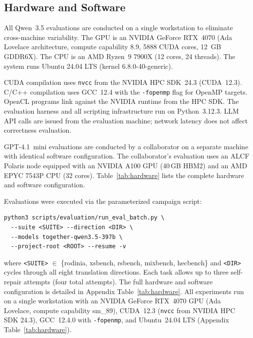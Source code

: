 \documentclass[conference]{IEEEtran}
\begin{document}
\subsection{Hardware and Software}
\label{sec:hardware}

All Qwen~3.5 evaluations are conducted on a single workstation to eliminate cross-machine variability. The GPU is an NVIDIA GeForce RTX~4070 (Ada Lovelace architecture, compute capability 8.9, 5888 CUDA cores, 12~GB GDDR6X). The CPU is an AMD Ryzen~9 7900X (12 cores, 24 threads). The system runs Ubuntu 24.04 LTS (kernel 6.8.0-40-generic).

CUDA compilation uses \texttt{nvcc} from the NVIDIA HPC SDK~24.3 (CUDA~12.3). C/C++ compilation uses GCC~12.4 with the \texttt{-fopenmp} flag for OpenMP targets. OpenCL programs link against the NVIDIA runtime from the HPC SDK. The evaluation harness and all scripting infrastructure run on Python~3.12.3. LLM API calls are issued from the evaluation machine; network latency does not affect correctness evaluation.

GPT-4.1~mini evaluations are conducted by a collaborator on a separate machine with identical software configuration. The collaborator's evaluation uses an ALCF Polaris node equipped with an NVIDIA A100 GPU (40\,GB HBM2) and an AMD EPYC 7543P CPU (32 cores). Table~\ref{tab:hardware} lists the complete hardware and software configuration.

Evaluations were executed via the parameterized campaign script:
\begin{small}
\begin{verbatim}
python3 scripts/evaluation/run_eval_batch.py \
  --suite <SUITE> --direction <DIR> \
  --models together-qwen3.5-397b \
  --project-root <ROOT> --resume -v
\end{verbatim}
\end{small}
\noindent where \texttt{<SUITE>} $\in$ \{rodinia, xsbench, rsbench, mixbench, hecbench\}
and \texttt{<DIR>} cycles through all eight translation directions.
Each task allows up to three self-repair attempts (four total attempts).
The full hardware and software configuration is detailed in Appendix Table~\ref{tab:hardware}.
All experiments run on a single workstation with an NVIDIA GeForce
RTX~4070 GPU (Ada Lovelace, compute capability sm\_89), CUDA~12.3
(\texttt{nvcc} from NVIDIA HPC SDK 24.3), GCC~12.4.0 with
\texttt{-fopenmp}, and Ubuntu~24.04 LTS
(Appendix Table~\ref{tab:hardware}).
\end{document}
